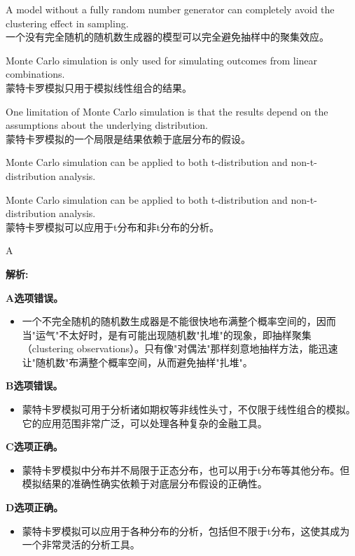 \documentclass{article}
\newenvironment{explanation}
{\textbf{解析:}\par}
{\par}
\begin{document}
\begin{choices}
    \item A model without a fully random number generator can completely avoid the clustering effect in sampling.\\
    一个没有完全随机的随机数生成器的模型可以完全避免抽样中的聚集效应。
    \item Monte Carlo simulation is only used for simulating outcomes from linear combinations.\\
    蒙特卡罗模拟只用于模拟线性组合的结果。
    \item One limitation of Monte Carlo simulation is that the results depend on the assumptions about the underlying distribution.\\
    蒙特卡罗模拟的一个局限是结果依赖于底层分布的假设。
    \item Monte Carlo simulation can be applied to both t-distribution and non-t-distribution analysis.
    \item Monte Carlo simulation can be applied to both t-distribution and non-t-distribution analysis.\\
    蒙特卡罗模拟可以应用于t分布和非t分布的分析。
\end{choices}

\begin{correctanswer}
A
\end{correctanswer}

\begin{explanation}
\textbf{A选项错误。}
\begin{itemize}
    \item 一个不完全随机的随机数生成器是不能很快地布满整个概率空间的，因而当"运气"不太好时，是有可能出现随机数"扎堆"的现象，即抽样聚集（clustering observations）。只有像"对偶法"那样刻意地抽样方法，能迅速让"随机数"布满整个概率空间，从而避免抽样"扎堆"。
\end{itemize}

\textbf{B选项错误。}
\begin{itemize}
    \item 蒙特卡罗模拟可用于分析诸如期权等非线性头寸，不仅限于线性组合的模拟。它的应用范围非常广泛，可以处理各种复杂的金融工具。
\end{itemize}

\textbf{C选项正确。}
\begin{itemize}
    \item 蒙特卡罗模拟中分布并不局限于正态分布，也可以用于t分布等其他分布。但模拟结果的准确性确实依赖于对底层分布假设的正确性。
\end{itemize}

\textbf{D选项正确。}
\begin{itemize}
    \item 蒙特卡罗模拟可以应用于各种分布的分析，包括但不限于t分布，这使其成为一个非常灵活的分析工具。
\end{itemize}
\end{explanation}
\end{document}

